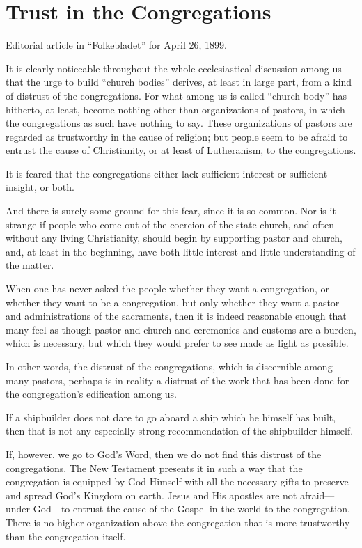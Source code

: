 
\section{Trust in the Congregations}

Editorial article in “Folkebladet” for April 26, 1899.

It is clearly noticeable throughout the whole ecclesiastical discussion among us that the urge to build “church bodies” derives, at least in large part, from a kind of distrust of the congregations. For what among us is called “church body” has hitherto, at least, become nothing other than organizations of pastors, in which the congregations as such have nothing to say. These organizations of pastors are regarded as trustworthy in the cause of religion; but people seem to be afraid to entrust the cause of Christianity, or at least of Lutheranism, to the congregations.

It is feared that the congregations either lack sufficient interest or sufficient insight, or both.

And there is surely some ground for this fear, since it is so common. Nor is it strange if people who come out of the coercion of the state church, and often without any living Christianity, should begin by supporting pastor and church, and, at least in the beginning, have both little interest and little understanding of the matter.

When one has never asked the people whether they want a congregation, or whether they want to be a congregation, but only whether they want a pastor and administrations of the sacraments, then it is indeed reasonable enough that many feel as though pastor and church and ceremonies and customs are a burden, which is necessary, but which they would prefer to see made as light as possible.

In other words, the distrust of the congregations, which is discernible among many pastors, perhaps is in reality a distrust of the work that has been done for the congregation’s edification among us.

If a shipbuilder does not dare to go aboard a ship which he himself has built, then that is not any especially strong recommendation of the shipbuilder himself.

If, however, we go to God’s Word, then we do not find this distrust of the congregations. The New Testament presents it in such a way that the congregation is equipped by God Himself with all the necessary gifts to preserve and spread God’s Kingdom on earth. Jesus and His apostles are not afraid—under God—to entrust the cause of the Gospel in the world to the congregation. There is no higher organization above the congregation that is more trustworthy than the congregation itself.

